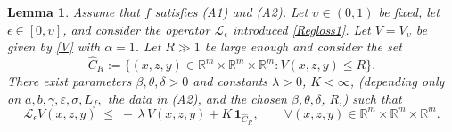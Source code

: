 \documentclass[11pt, a4paper,leqno]{amsart}
\newtheorem{lemma}{Lemma}[section]
\theoremstyle{definition}
\numberwithin{equation}{section}
\newcommand{\R}{\mathbb R}
\begin{document}
\begin{lemma}\label{drift} Assume that $f$ satisfies \textnormal{(A1)} and \textnormal{(A2)}. Let $\upsilon\in (0,1)$ be fixed, let $\epsilon\in [0,\upsilon]$, and consider
the operator $\mathcal{L}_\epsilon$ introduced \eqref{Regloss1}. Let $V=V_\upsilon$ be given by \eqref{V} with $\alpha=1$.  Let $R\gg 1$ be large enough and consider
the set $$\hat C_R:=\{(x,z,y)\in \R^{m}\times \R^m\times \R^m : V(x,z,y)\le R\}.$$
There exist parameters $\beta,\theta,\delta>0$ and constants $\lambda>0$, $K<\infty$,
(depending only on $a,b,\gamma,\varepsilon,\sigma,L_f,$ the data in \textnormal{(A2)}, and the chosen $\beta,\theta,\delta$, $R$,) such that
\begin{equation}\label{eq:drift-ineq}
{\mathcal L}_\epsilon V(x,z,y)
\;\le\; -\,\lambda\,V(x,z,y) + K\,\mathbf 1_{\hat C_R},
\qquad \forall (x,z,y)\in \R^{m}\times \R^m\times \R^m.
\end{equation}
\end{lemma}
\end{document}
